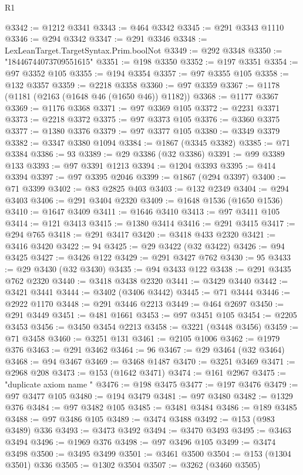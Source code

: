 \begin{lexlean}{R1}
\begin{coremodule}
{{{{{{{{{{{{{{{{{{{{{{{{{{{{{{{{{{{{{{{{{{{{{{{{{{{{{{{{{{{{{{{{{{{{{{{{{{{{{{{{{{{{{{{{{{{{{{{{{{{{{{{{{{{{{{{{{{{{{{{{{{{{{{{{{{{{{{{{{{{{{{{{{{{{{{{{{{{{{{{{{{{{{{{{{{{{{{{{{{{{{{{{{{@3342 := @1212 @3341
@3343 := @464 @3342
@3345 := @291 @3343 @1110
@3346 := @294 @3342
@3347 := @291 @3346
@3348 := LexLeanTarget.TargetSyntax.Prim.boolNot
@3349 := @292 @3348
@3350 := "18446744073709551615"
@3351 := @198 @3350
@3352 := @197 @3351
@3354 := @97 @3352 @105
@3355 := @194 @3354
@3357 := @97 @3355 @105
@3358 := @132 @3357
@3359 := @2218 @3358
@3360 := @97 @3359
@3367 := @1178 (@1181 (@2163 (@1648 @46 (@1650 @46)) @1182))
@3368 := @1177 @3367
@3369 := @1176 @3368
@3371 := @97 @3369 @105
@3372 := @2231 @3371
@3373 := @2218 @3372
@3375 := @97 @3373 @105
@3376 := @3360 @3375
@3377 := @1380 @3376
@3379 := @97 @3377 @105
@3380 := @3349 @3379
@3382 := @3347 @3380 @1094
@3384 := @1867 (@3345 @3382)
@3385 := @71 @3384
@3386 := 93
@3389 := @29 @3386 (@32 @3386)
@3391 := @99 @3389 @133
@3393 := @97 @3391 @1213
@3394 := @1204 @3393
@3395 := @414 @3394
@3397 := @97 @3395 @2046
@3399 := @1867 (@294 @3397)
@3400 := @71 @3399
@3402 := @83 @2825 @403
@3403 := @132 @2349
@3404 := @294 @3403
@3406 := @291 @3404 @2320
@3409 := @1648 @1536 (@1650 @1536)
@3410 := @1647 @3409
@3411 := @1646 @3410
@3413 := @97 @3411 @105
@3414 := @121 @3413
@3415 := @1380 @3414
@3416 := @291 @3415
@3417 := @294 @765
@3418 := @291 @3417
@3420 := @3418 @433 @2320
@3421 := @3416 @3420
@3422 := 94
@3425 := @29 @3422 (@32 @3422)
@3426 := @94 @3425
@3427 := @3426 @122
@3429 := @291 @3427 @762
@3430 := 95
@3433 := @29 @3430 (@32 @3430)
@3435 := @94 @3433 @122
@3438 := @291 @3435 @762 @2320
@3440 := @3418 @3438 @2320
@3441 := @3429 @3440
@3442 := @3421 @3441
@3444 := @3402 (@3406 @3442)
@3445 := @71 @3444
@3446 := @2922 @1170
@3448 := @291 @3446 @2213
@3449 := @464 @2697
@3450 := @291 @3449
@3451 := @481 @1661
@3453 := @97 @3451 @105
@3454 := @2205 @3453
@3456 := @3450 @3454 @2213
@3458 := @3221 (@3448 @3456)
@3459 := @71 @3458
@3460 := @3251 @131
@3461 := @2105 @1006
@3462 := @1979 @376
@3463 := @291 @3462
@3464 := 96
@3467 := @29 @3464 (@32 @3464)
@3468 := @94 @3467
@3469 := @3468 @1487
@3470 := @3251 @3469
@3471 := @2968 @208
@3473 := @153 (@1642 @3471)
@3474 := @161 @2967
@3475 := "duplicate axiom name "
@3476 := @198 @3475
@3477 := @197 @3476
@3479 := @97 @3477 @105
@3480 := @194 @3479
@3481 := @97 @3480
@3482 := @1329 @376
@3484 := @97 @3482 @105
@3485 := @3481 @3484
@3486 := @189 @3485
@3488 := @97 @3486 @105
@3489 := @3474 @3488
@3492 := @153 (@983 @3489) @336
@3493 := @3473 @3492
@3494 := @3470 @3493
@3495 := @3463 @3494
@3496 := @1969 @376
@3498 := @97 @3496 @105
@3499 := @3474 @3498
@3500 := @3495 @3499
@3501 := @3461 @3500
@3504 := @153 (@1304 @3501) @336
@3505 := @1302 @3504
@3507 := @3262 (@3460 @3505)
}}}}}}}}}}}}}}}}}}}}}}}}}}}}}}}}}}}}}}}}}}}}}}}}}}}}}}}}}}}}}}}}}}}}}}}}}}}}}}}}}}}}}}}}}}}}}}}}}}}}}}}}}}}}}}}}}}}}}}}}}}}}}}}}}}}}}}}}}}}}}}}}}}}}}}}}}}}}}}}}}}}}}}}}}}}}}}}}}}}}}}}}}}
\end{coremodule}
\end{lexlean}
